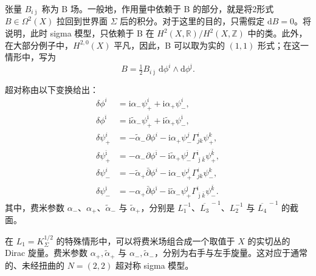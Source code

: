 张量 $B_{i\bar\jmath}$ 称为 B 场。一般地，作用量中依赖于 B 的部分，就是将2形式 $B\in\Omega^2(X)$ 拉回到世界面 $\Sigma$ 后的积分。对于这里的目的，只需假定 $\mathrm{d}B=0$。将说明，此时 sigma 模型，只依赖于 B 在 $H^2(X,\mathbb{R})/H^2(X,\mathbb{Z})$ 中的类。此外，在大部分例子中，$H^{2,0}(X)$ 平凡，因此，B 可以取为实的 $(1,1)$ 形式；在这一情形中，写为
\[
B=\tfrac12B_{i\bar\jmath}\,
\mathrm{d}\phi^i\wedge\mathrm{d}\phi^{\bar\jmath}.
\]

超对称由以下变换给出：
\begin{equation}\label{eq:3.87}
\begin{aligned}
\delta\phi^i&=\mathrm{i}\alpha_-\psi_+^i
+\mathrm{i}\alpha_+\psi_-^i,\\
\delta\phi^{\bar\imath}&=\mathrm{i}\widetilde\alpha_-\psi_+^{\bar\imath}
+\mathrm{i}\widetilde\alpha_+\psi_-^{\bar\imath},\\
\delta\psi_+^i&=-\widetilde\alpha_-\partial\phi^i
-\mathrm{i}\alpha_+\psi_-^j\Gamma^i_{jk}\psi_+^k,\\
\delta\psi_+^{\bar\imath}&=-\alpha_-\partial\phi^{\bar\imath}
-\mathrm{i}\widetilde\alpha_+\psi_-^{\bar\jmath}
\Gamma^{\bar\imath}_{\bar\jmath\bar k}\psi_+^{\bar k},\\
\delta\psi_-^i&=-\widetilde\alpha_+\bar\partial\phi^i
-\mathrm{i}\alpha_-\psi_+^j\Gamma^i_{jk}\psi_-^k,\\
\delta\psi_-^{\bar\imath}&=-\alpha_+\bar\partial\phi^{\bar\imath}
-\mathrm{i}\widetilde\alpha_-\psi_+^{\bar\jmath}
\Gamma^{\bar\imath}_{\bar\jmath\bar k}\psi_-^{\bar k}.
\end{aligned}
\end{equation}
其中，费米参数 $\alpha_-$、$\alpha_+$、$\widetilde\alpha_-$ 与 $\widetilde\alpha_+$，分别是 $L_1^{-1}$、$\overline{L_3}^{\,-1}$、$L_2^{-1}$ 与 $\overline{L_4}^{\,-1}$ 的截面。

在 $L_1=K_\Sigma^{1/2}$ 的特殊情形中，可以将费米场组合成一个取值于 $X$ 的实切丛的 Dirac 旋量。费米参数 $\alpha_+,\widetilde\alpha_+$ 与 $\alpha_-,\widetilde\alpha_-$，分别为右手与左手旋量。这对应于通常的、未经扭曲的 $N=(2,2)$ 超对称 sigma 模型。

